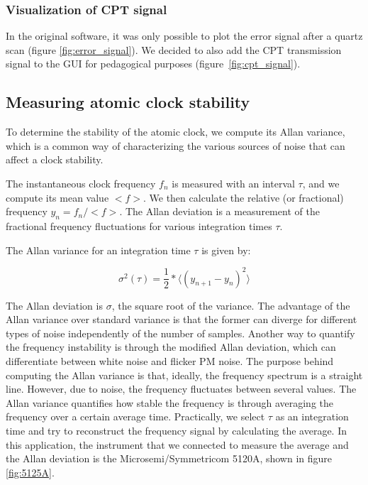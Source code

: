\documentclass[a4paper,12pt]{article}
\begin{document}
\subsubsection{Visualization of CPT signal}
\label{section:CPT}

In the original software, it was only possible to plot the error signal after a quartz scan (figure \ref{fig:error_signal}). We decided to also add the CPT transmission signal to the GUI for pedagogical purposes \mbox{(figure \ref{fig:cpt_signal})}.

\subsection{Measuring atomic clock stability}

To determine the stability of the atomic clock, we compute its Allan variance, which is a common way of characterizing the various sources of noise that can affect a clock stability. 

The instantaneous clock frequency $f_n$ is measured with an interval $\tau$, and we compute its mean value $<f>$. We then calculate the relative (or fractional) frequency $y_n = f_n / <f>$.
The Allan deviation is a measurement of the fractional frequency fluctuations for various integration times $\tau$.

The Allan variance for an integration time $\tau$ is given by:

\begin{equation}
\sigma^2 (\tau) = \frac{1}{2}* \langle (y_{n+1}-y_n)^2 \rangle
\end{equation}


The Allan deviation is $\sigma$, the square root of the variance. The advantage of the Allan variance over standard variance is that the former can diverge for different types of noise independently of the number of samples. Another way to quantify the frequency instability is through the modified Allan deviation, which can differentiate between white noise and flicker PM noise. The purpose behind computing the Allan variance is that, ideally, the frequency spectrum is a straight line. However, due to noise, the frequency fluctuates between several values. The Allan variance quantifies how stable the frequency is through averaging the frequency over a certain average time. Practically, we select $\tau$ as an integration time and try to reconstruct the frequency signal by calculating the average. In this application, the instrument that we connected to measure the average and the Allan deviation is the Microsemi\slash Symmetricom 5120A, shown in figure \ref{fig:5125A}.
\end{document}
